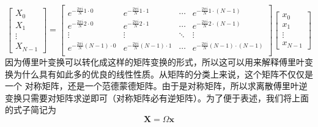         \begin{equation*}
            \left[\begin{matrix}
                X_0\\
                X_1\\
                \vdots\\
                X_{N - 1}
            \end{matrix}\right] = 
            \left[\begin{matrix}
                e^{-\frac{2\pi i}{N}1\cdot 0}& e^{-\frac{2\pi i}{N}1\cdot 1}& \cdots& e^{-\frac{2\pi i}{N}1\cdot (N - 1)}\\
                e^{-\frac{2\pi i}{N}2\cdot 0}& e^{-\frac{2\pi i}{N}2\cdot 1}& \cdots& e^{-\frac{2\pi i}{N}2\cdot (N - 1)}\\
                \vdots & \vdots & \ddots & \vdots\\
                e^{-\frac{2\pi i}{N}(N - 1)\cdot 0}& e^{-\frac{2\pi i}{N}(N - 1)\cdot 1}& \cdots& e^{-\frac{2\pi i}{N}(N - 1)\cdot (N - 1)}\\
            \end{matrix}\right]
            \left[\begin{matrix}
                x_0\\
                x_1\\
                \vdots\\
                x_{N - 1}
            \end{matrix}\right]
        \end{equation*}
        因为傅里叶变换可以转化成这样的矩阵变换的形式，所以这可以用来解释傅里叶变换为什么具有如此多的优良的线性性质。从矩阵的分类上来说，这个矩阵不仅仅是一个%
        对称矩阵，还是一个范德蒙德矩阵。由于是对称矩阵，所以求离散傅里叶逆变换只需要对矩阵求逆即可（对称矩阵必有逆矩阵）。为了便于表述，我们将上面的式子简记为
        \begin{equation}
            \textbf{X} = \Omega\textbf{x}
            \label{eq: 4.3}
        \end{equation}
